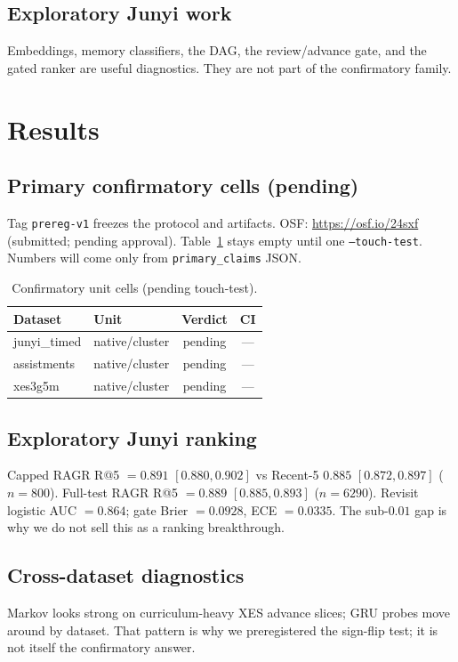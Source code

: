 \documentclass[conference,a4paper]{IEEEtran}
\begin{document}
\subsection{Exploratory Junyi work}
Embeddings, memory classifiers, the DAG, the review/advance gate, and the gated ranker are useful diagnostics.
They are not part of the confirmatory family.

\section{Results}
\subsection{Primary confirmatory cells (pending)}
Tag \texttt{prereg-v1} freezes the protocol and artifacts.
OSF: \url{https://osf.io/24sxf} (submitted; pending approval).
Table~\ref{tab:hrev} stays empty until one \texttt{--touch-test}.
Numbers will come only from \texttt{primary\_claims} JSON.

\begin{table}[t]
\centering
\caption{Confirmatory unit cells (pending touch-test).}
\label{tab:hrev}
\begin{tabular}{@{}llcc@{}}
\toprule
Dataset & Unit & Verdict & CI \\
\midrule
junyi\_timed & native/cluster & pending & --- \\
assistments & native/cluster & pending & --- \\
xes3g5m & native/cluster & pending & --- \\
\bottomrule
\end{tabular}
\end{table}

\subsection{Exploratory Junyi ranking}
Capped RAGR R@5 $=0.891$ $[0.880, 0.902]$ vs Recent-5 $0.885$ $[0.872, 0.897]$ ($n{=}800$).
Full-test RAGR R@5 $=0.889$ $[0.885, 0.893]$ ($n{=}6290$).
Revisit logistic AUC $=0.864$; gate Brier $=0.0928$, ECE $=0.0335$.
The sub-$0.01$ gap is why we do not sell this as a ranking breakthrough.

\subsection{Cross-dataset diagnostics}
Markov looks strong on curriculum-heavy XES advance slices; GRU probes move around by dataset.
That pattern is why we preregistered the sign-flip test; it is not itself the confirmatory answer.
\end{document}
